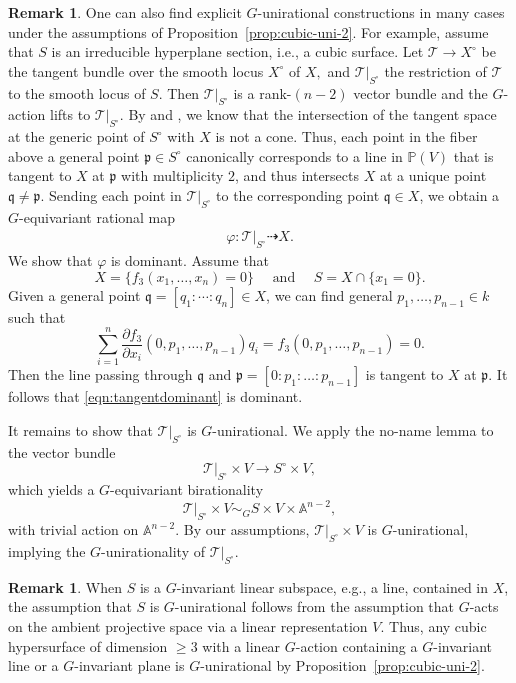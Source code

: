 \documentclass[12pt,reqno]{amsart}
\theoremstyle{plain}
\theoremstyle{remark}
\theoremstyle{definition}
\newtheorem{rema}[prop]{Remark}
\numberwithin{equation}{section}
\def\cT{{\mathcal T}}
\def\bA{{\mathbb A}}
\def\bP{{\mathbb P}}
\begin{document}
\begin{rema}\label{rema:explicitcub}
    One can also find explicit $G$-unirational constructions in many cases under the assumptions of Proposition~\ref{prop:cubic-uni-2}. For example, assume that $S$ is an irreducible hyperplane section, i.e., a cubic surface. Let $\cT\to X^\circ$ be the tangent bundle over the smooth locus $X^\circ$ of $X,$ and $\cT\vert_{S^\circ}$ the restriction of $\cT$ to the smooth locus of $S$. Then $\cT\vert_{S^\circ}$ is a rank-$(n-2)$ vector bundle and the $G$-action lifts to $\cT\vert_{S^\circ}$. By \cite[Theorem 4.2]{starsmooth} and \cite[Theorem 2.5]{starsing}, we know that the intersection of the tangent space at the generic point of $S^\circ$  with $X$ is not a cone. Thus, each point in the fiber above a general point $\mathfrak p\in S^\circ$ canonically corresponds to a line in $\bP(V)$ that is tangent to $X$ at $\mathfrak p$ with multiplicity $2$, and thus intersects $X$ at a unique point $\mathfrak q\neq \mathfrak p$. Sending each point in $\cT\vert_{S^\circ}$ to the corresponding point $\mathfrak q\in X$, we obtain a $G$-equivariant rational map
\begin{align}\label{eqn:tangentdominant}
    \varphi:\cT\vert_{S^\circ}\dashrightarrow X.
\end{align}
We show  that $\varphi$ is dominant. Assume that
$$
X=\{f_3(x_1,\ldots,x_{n})=0\} \quad \text{ and }\quad S=X\cap\{x_1=0\}.
$$ 
Given a general point $\mathfrak q=[q_1:\cdots:q_{n}]\in X$, we can find general $p_1,\ldots,p_{n-1}\in k$ such that 
$$
    \sum_{i=1}^{n}\frac{\partial f_3}{\partial x_i}(0,p_1,\ldots,p_{n-1}) q_i=f_3(0,p_1,\ldots,p_{n-1})=0.
$$
Then the line passing through $\mathfrak q$ and $\mathfrak p=[0:p_1:\ldots:p_{n-1}]$ is tangent to $X$ at $\mathfrak p$. It follows that \eqref{eqn:tangentdominant} is dominant. 

It remains to show that $\cT\vert_{S^\circ}$ is $G$-unirational. We apply the no-name lemma to the vector bundle 
$$
\cT|_{S^\circ} \times V \to S^\circ\times V,
$$
which  yields a $G$-equivariant birationality 
$$
\cT|_{S^\circ} \times V \sim_G S\times V \times\bA^{n-2},
$$
with trivial action on $\bA^{n-2}$. By our assumptions,  $\cT\vert_{S^\circ}\times V$ is $G$-unirational, implying the $G$-unirationality of $\cT\vert_{S^\circ}$.
\end{rema}


\begin{rema}
\label{rema:canbe}
When $S$ is a $G$-invariant linear subspace, e.g., a line, contained in $X$, the assumption that $S$ is $G$-unirational follows from the assumption that $G$-acts on the ambient projective space via a linear representation $V$. Thus, any cubic hypersurface of dimension $\geq 3$ with a linear $G$-action containing a $G$-invariant line or a $G$-invariant plane is $G$-unirational by Proposition~\ref{prop:cubic-uni-2}.
\end{rema}
\end{document}
